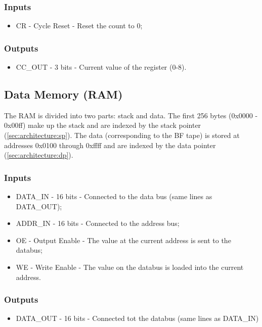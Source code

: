 \subsubsection*{Inputs}
\begin{itemize}
\itemsep0em
\item CR - Cycle Reset - Reset the count to 0;
\end{itemize}

\subsubsection*{Outputs}
\begin{itemize}
\itemsep0em
\item CC\_OUT - 3 bits - Current value of the register (0-8).
\end{itemize}

\subsection{Data Memory (RAM)}  \label{sec:architecture:ram}
The RAM is divided into two parts: stack and data. The first 256 bytes (0x0000 - 0x00ff) make up the stack and are indexed by the stack pointer (\ref{sec:architecture:sp}). The data (corresponding to the BF tape) is stored at addresses 0x0100 through 0xffff and are indexed by the data pointer (\ref{sec:architecture:dp}). 

\subsubsection*{Inputs}
\begin{itemize}
\itemsep0em 
\item DATA\_IN - 16 bits - Connected to the data bus (same lines as DATA\_OUT);
\item ADDR\_IN - 16 bits - Connected to the address bus;
\item OE - Output Enable - The value at the current address is sent to the databus;
\item WE - Write Enable - The value on the databus is loaded into the current address.
\end{itemize}

\subsubsection*{Outputs}
\begin{itemize}
\itemsep0em 
\item DATA\_OUT - 16 bits - Connected tot the databus (same lines as DATA\_IN)
\end{itemize}

